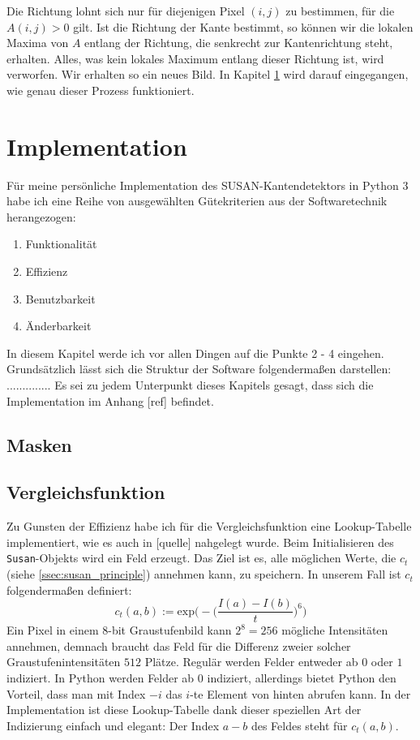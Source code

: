 \documentclass[a4paper, 11pt]{report}
\theoremstyle{definition}
\begin{document}
		Die Richtung lohnt sich nur für diejenigen Pixel $(i,j)$ zu bestimmen, für die $A(i,j) > 0$ gilt. Ist die Richtung der Kante bestimmt, so können wir die lokalen Maxima von $A$ entlang der Richtung, die senkrecht zur Kantenrichtung steht, erhalten. Alles, was kein lokales Maximum entlang dieser Richtung ist, wird verworfen. Wir erhalten so ein neues Bild. In Kapitel \ref{sec:implementation} wird darauf eingegangen, wie genau dieser Prozess funktioniert.

		\section{Implementation}\label{sec:implementation}
		Für meine persönliche Implementation des SUSAN-Kantendetektors in Python 3 habe ich eine Reihe von ausgewählten Gütekriterien aus der Softwaretechnik herangezogen:
			\begin{enumerate}
				\item Funktionalität
				\item Effizienz
				\item Benutzbarkeit
				\item Änderbarkeit
			\end{enumerate}
		In diesem Kapitel werde ich vor allen Dingen auf die Punkte 2 - 4 eingehen.
		Grundsätzlich lässt sich die Struktur der Software folgendermaßen darstellen: ..............
		Es sei zu jedem Unterpunkt dieses Kapitels gesagt, dass sich die Implementation im Anhang [ref] befindet.
		
		\subsection{Masken}

		\subsection{Vergleichsfunktion}
			Zu Gunsten der Effizienz habe ich für die Vergleichsfunktion eine Lookup-Tabelle implementiert, wie es auch in [quelle] nahgelegt wurde. Beim Initialisieren des \texttt{Susan}-Objekts wird ein Feld erzeugt. Das Ziel ist es, alle möglichen Werte, die $c_t$ (siehe \ref{ssec:susan_principle}) annehmen kann, zu speichern.
			In unserem Fall ist $c_t$ folgendermaßen definiert:
			$$ 
				c_t(a,b) :=  
					\text{exp}\bigg(-\Big(\frac{I(a) - I(b)}{t}\Big)^6\bigg)
			$$
			Ein Pixel in einem 8-bit Graustufenbild kann $2^8 = 256$ mögliche Intensitäten annehmen, demnach braucht das Feld für die Differenz zweier solcher Graustufenintensitäten $512$ Plätze.
			Regulär werden Felder entweder ab $0$ oder $1$ indiziert. In Python werden Felder ab $0$ indiziert, allerdings bietet Python den Vorteil, dass man mit Index $-i$ das $i$-te Element von hinten abrufen kann. In der Implementation ist diese Lookup-Tabelle dank dieser speziellen Art der Indizierung einfach und elegant: Der Index $a-b$ des Feldes steht für $c_t(a,b)$.
\end{document}
